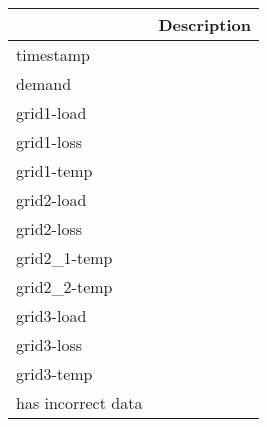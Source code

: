 \begin{tabular}{ll}
\toprule
{} & Description \\
\midrule
timestamp          &             \\
demand             &             \\
grid1-load         &             \\
grid1-loss         &             \\
grid1-temp         &             \\
grid2-load         &             \\
grid2-loss         &             \\
grid2\_1-temp       &             \\
grid2\_2-temp       &             \\
grid3-load         &             \\
grid3-loss         &             \\
grid3-temp         &             \\
has incorrect data &             \\
\bottomrule
\end{tabular}

